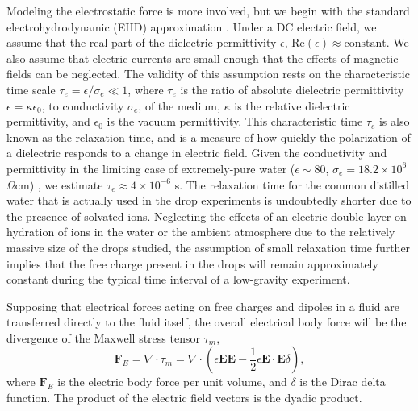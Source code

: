 \documentclass[12pt,a4paper,oneside]{book}
\begin{document}
Modeling the electrostatic force is more involved, but we begin with the standard electrohydrodynamic (EHD) approximation \cite{saville_electrohydrodynamics:_1997}. Under a DC electric field, we assume that the real part of the dielectric permittivity $\epsilon$, $\mbox{Re} \left( \epsilon \right) \approx  \mbox{constant}$. We also assume that electric currents are small enough that the effects of magnetic fields can be neglected. The validity of this assumption rests on the characteristic time scale $\tau_e = \epsilon /\sigma_e \ll 1$, where $\tau_e$ is the ratio of absolute dielectric permittivity $\epsilon = \kappa \epsilon_0$, to conductivity $\sigma_e$, of the medium, $\kappa$ is the relative dielectric permittivity, and $\epsilon_0$ is the vacuum permittivity. This characteristic time $\tau_e$ is also known as the relaxation time, and is a measure of how quickly the polarization of a dielectric responds to a change in electric field. Given the conductivity and permittivity in the limiting case of extremely-pure water ($ \epsilon \sim 80$, $\sigma_e = 18.2 \times 10^{6}$ $\Omega\mbox{cm}$) \cite{yatsuzuka_electrification_1994}, we estimate $\tau_e \approx 4 \times 10^{-6}$ s. The relaxation time for the common distilled water that is actually used in the drop experiments is undoubtedly shorter due to the presence of solvated ions. Neglecting the effects of an electric double layer on hydration of ions in the water or the ambient atmosphere due to the relatively massive size of the drops studied, the assumption of small relaxation time further implies that the free charge present in the drops will remain approximately constant during the typical time interval of a low-gravity experiment.

Supposing that electrical forces acting on free charges and dipoles in a fluid are transferred directly to the fluid itself, the overall electrical body force will be the divergence of the Maxwell stress tensor $\tau_m $,
\[ \mathbf{F}_E = \nabla \cdot \tau_m = \nabla \cdot \left( \epsilon \mathbf{E} \mathbf{E} - \frac{1}{2} \epsilon \mathbf{E} \cdot \mathbf{E} \delta \right) ,\]
where $\mathbf{F}_E$ is the electric body force per unit volume, and $\delta$ is the Dirac delta function. The product of the electric field vectors is the dyadic product.  
\end{document}
